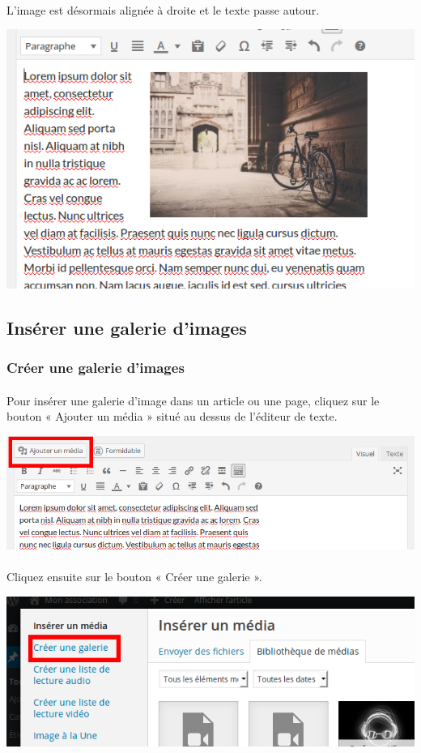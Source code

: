 \documentclass[10pt,a4paper]{article}
\begin{document}
\paragraph{}L'image est désormais alignée à droite et le texte passe autour.
\begin{center}
\includegraphics[scale=0.3]{img/0113.png}
\end{center}
\newpage
\subsection{Insérer une galerie d'images}
\subsubsection{Créer une galerie d'images}
\paragraph{}Pour insérer une galerie d'image dans un article ou une page, cliquez sur le bouton « Ajouter un média » situé au dessus de l'éditeur de texte.
\begin{center}
\includegraphics[scale=0.3]{img/0102.png}
\end{center}
\paragraph{}Cliquez ensuite sur le bouton « Créer une galerie ».
\begin{center}
\includegraphics[scale=0.3]{img/0114.png}
\end{center}
\end{document}
